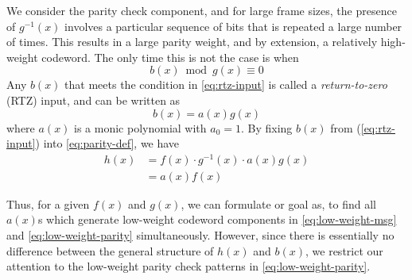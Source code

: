 We consider the parity check component, and for large frame sizes, the presence of $g^{-1}(x)$ involves a particular sequence of bits that is repeated a large number of times. This results in a large parity weight, and by extension, a relatively high-weight codeword. The only time this is not the case is when
\begin{equation}
b(x) \bmod g(x) \equiv 0
\label{eq:rtz-input}
\end{equation}
Any $b(x)$ that meets the condition in \eqref{eq:rtz-input} is called a \textit{return-to-zero} (RTZ) input, and can be written as 
\begin{equation}
b(x) =a(x)g(x)
\label{eq:low-weight-msg}
\end{equation}
where $a(x)$ is a monic polynomial with $a_0=1$.
By fixing $b(x)$ from (\ref{eq:rtz-input}) into \eqref{eq:parity-def}, we have 
\begin{equation}
\begin{split}
h(x)&=f(x)\cdot g^{-1}(x)\cdot a(x)g(x)\\
&=a(x)f(x)
\end{split}
\label{eq:low-weight-parity}
\end{equation}


Thus, for a given $f(x)$ and $g(x)$, we can formulate or goal as, to find all $a(x)$s which generate low-weight codeword components in  \eqref{eq:low-weight-msg} and  \eqref{eq:low-weight-parity} simultaneously. 
However, since there is essentially no difference between the general structure of $h(x)$ and $b(x)$, we restrict our attention to the low-weight parity check patterns in \eqref{eq:low-weight-parity}.

